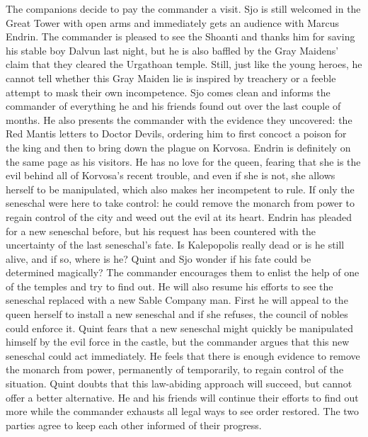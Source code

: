 The companions decide to pay the commander a visit. Sjo is still welcomed in the Great Tower with open arms and immediately gets an audience with Marcus Endrin. The commander is pleased to see the Shoanti and thanks him for saving his stable boy Dalvun last night, but he is also baffled by the Gray Maidens' claim that they cleared the Urgathoan temple. Still, just like the young heroes, he cannot tell whether this Gray Maiden lie is inspired by treachery or a feeble attempt to mask their own incompetence. Sjo comes clean and informs the commander of everything he and his friends found out over the last couple of months. He also presents the commander with the evidence they uncovered: the Red Mantis letters to Doctor Devils, ordering him to first concoct a poison for the king and then to bring down the plague on Korvosa. Endrin is definitely on the same page as his visitors. He has no love for the queen, fearing that she is the evil behind all of Korvosa's recent trouble, and even if she is not, she allows herself to be manipulated, which also makes her incompetent to rule. If only the seneschal were here to take control: he could remove the monarch from power to regain control of the city and weed out the evil at its heart. Endrin has pleaded for a new seneschal before, but his request has been countered with the uncertainty of the last seneschal's fate. Is Kalepopolis really dead or is he still alive, and if so, where is he? Quint and Sjo wonder if his fate could be determined magically? The commander encourages them to enlist the help of one of the temples and try to find out. He will also resume his efforts to see the seneschal replaced with a new Sable Company man. First he will appeal to the queen herself to install a new seneschal and if she refuses, the council of nobles could enforce it. Quint fears that a new seneschal might quickly be manipulated himself by the evil force in the castle, but the commander argues that this new seneschal could act immediately. He feels that there is enough evidence to remove the monarch from power, permanently of temporarily, to regain control of the situation. Quint doubts that this law-abiding approach will succeed, but cannot offer a better alternative. He and his friends will continue their efforts to find out more while the commander exhausts all legal ways to see order restored. The two parties agree to keep each other informed of their progress.\\

